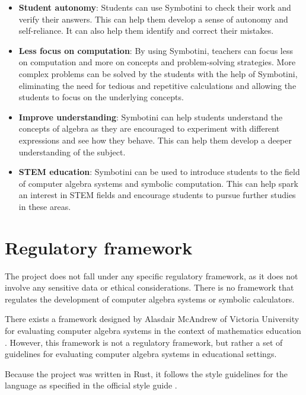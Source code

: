 \begin{itemize}
    \item \textbf{Student autonomy}: Students can use Symbotini to check their work and verify their answers. This can help them develop a sense of autonomy and self-reliance. It can also help them identify and correct their mistakes.
    \item \textbf{Less focus on computation}: By using Symbotini, teachers can focus less on computation and more on concepts and problem-solving strategies. More complex problems can be solved by the students with the help of Symbotini, eliminating the need for tedious and repetitive calculations and allowing the students to focus on the underlying concepts.
    \item \textbf{Improve understanding}: Symbotini can help students understand the concepts of algebra as they are encouraged to experiment with different expressions and see how they behave. This can help them develop a deeper understanding of the subject.
    \item \textbf{STEM education}: Symbotini can be used to introduce students to the field of computer algebra systems and symbolic computation. This can help spark an interest in STEM fields and encourage students to pursue further studies in these areas.
\end{itemize}

\section{Regulatory framework}\label{sec:regulatory-framework}

The project does not fall under any specific regulatory framework, as it does not involve any sensitive data or ethical considerations. There is no framework that regulates the development of computer algebra systems or symbolic calculators.

There exists a framework designed by Alasdair McAndrew of Victoria University for evaluating computer algebra systems in the context of mathematics education \parencite{mcandrewframework}. However, this framework is not a regulatory framework, but rather a set of guidelines for evaluating computer algebra systems in educational settings.

Because the project was written in Rust, it follows the style guidelines for the language as specified in the official style guide \parencite{rust-style-guide}.
